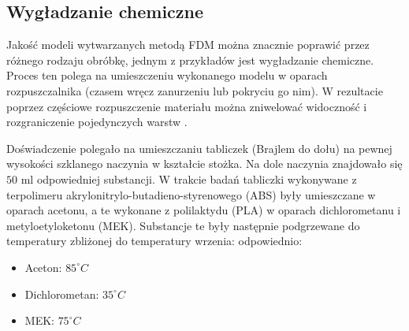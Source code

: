 \documentclass[12pt,a4paper]{article}
\begin{document}
\subsection{Wygładzanie chemiczne}
Jakość modeli wytwarzanych metodą FDM można znacznie poprawić przez różnego rodzaju obróbkę, jednym z przykładów jest wygładzanie chemiczne.
Proces ten polega na umieszczeniu wykonanego modelu w oparach rozpuszczalnika (czasem wręcz zanurzeniu lub pokryciu go nim). W rezultacie poprzez częściowe rozpuszczenie materiału można zniwelować widoczność i rozgraniczenie pojedynczych warstw \cite{postprocessing}.

Doświadczenie polegało na umieszczaniu tabliczek (Brajlem do dołu) na pewnej wysokości szklanego naczynia w kształcie stożka. Na dole naczynia znajdowało się $50 \text{ ml}$ odpowiedniej substancji.  W trakcie badań tabliczki wykonywane z terpolimeru akrylonitrylo-butadieno-styrenowego (ABS) były umieszczane w oparach acetonu, a te wykonane z polilaktydu (PLA) w oparach dichlorometanu i metyloetyloketonu (MEK).
Substancje te były następnie podgrzewane do temperatury zbliżonej do temperatury wrzenia: odpowiednio:
\begin{itemize}
\item Aceton: $85^{\circ} C$
\item Dichlorometan: $35^{\circ} C$
\item MEK: $75^{\circ} C$
\end{itemize} 
\end{document}
